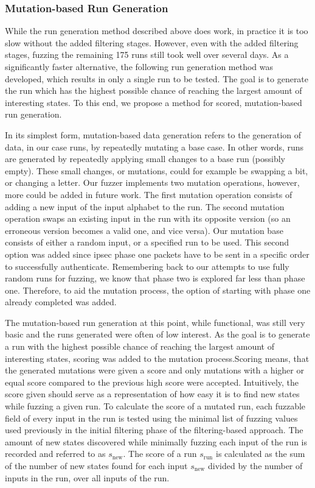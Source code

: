\subsubsection{Mutation-based Run Generation} \label{subsubsec:mutations}
While the run generation method described above does work, in practice it is too slow without the added filtering stages. However, even with the added filtering stages, fuzzing the remaining 175 runs still took well over several days. As a significantly faster alternative, the following run generation method was developed, which results in only a single run to be tested. The goal is to generate the run which has the highest possible chance of reaching the largest amount of interesting states. To this end, we propose a method for scored, mutation-based run generation. 

In its simplest form, mutation-based data generation refers to the generation of data, in our case runs, by repeatedly mutating a base case. In other words, runs are generated by repeatedly applying small changes to a base run (possibly empty). These small changes, or mutations, could for example be swapping a bit, or changing a letter. Our fuzzer implements two mutation operations, however, more could be added in future work. The first mutation operation consists of adding a new input of the input alphabet to the run. The second mutation operation swaps an existing input in the run with its opposite version (so an erroneous version becomes a valid one, and vice versa). Our mutation base consists of either a random input, or a specified run to be used. This second option was added since \ac{ipsec} phase one packets have to be sent in a specific order to successfully authenticate. Remembering back to our attempts to use fully random runs for fuzzing, we know that phase two is explored far less than phase one. Therefore, to aid the mutation process, the option of starting with phase one already completed was added.

The mutation-based run generation at this point, while functional, was still very basic and the runs generated were often of low interest. As the goal is to generate a run with the highest possible chance of reaching the largest amount of interesting states, scoring was added to the mutation process.Scoring means, that the generated mutations were given a score and only mutations with a higher or equal score compared to the previous high score were accepted. Intuitively, the score given should serve as a representation of how easy it is to find new states while fuzzing a given run. To calculate the score of a mutated run, each fuzzable field of every input in the run is tested using the minimal list of fuzzing values used previously in the initial filtering phase of the filtering-based approach. The amount of new states discovered while minimally fuzzing each input of the run is recorded and referred to as $s_\mathrm{new}$. The score of a run $s_\mathrm{run}$ is calculated as the sum of the number of new states found for each input $s_\mathrm{new}$ divided by the number of inputs in the run, over all inputs of the run.

